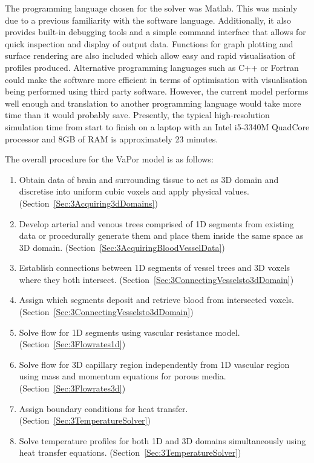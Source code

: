 \documentclass[11pt,english,a4paper,twoside,openright]{report}
\begin{document}
{{{{{{{{The programming language chosen for the solver was Matlab. This was mainly due to a previous familiarity with the software language. Additionally, it also provides built-in debugging tools and a simple command interface that allows for quick inspection and display of output data. Functions for graph plotting and surface rendering are also included which allow easy and rapid visualisation of profiles produced. Alternative programming languages such as C++ or Fortran could make the software more efficient in terms of optimisation with visualisation being performed using third party software. However, the current model performs well enough and translation to another programming language would take more time than it would probably save. Presently, the typical high-resolution simulation time from start to finish on a laptop with an Intel i5-3340M QuadCore processor and 8GB of RAM is approximately 23 minutes.

The overall procedure for the VaPor model is as follows:

\begin{enumerate}
	\setlength\itemsep{0em}
	\item Obtain data of brain and surrounding tissue to act as 3D domain and discretise into uniform cubic voxels and apply physical values. (Section~\ref{Sec:3Acquiring3dDomains})
	\item Develop arterial and venous trees comprised of 1D segments from existing data or procedurally generate them and place them inside the same space as 3D domain. (Section~\ref{Sec:3AcquiringBloodVesselData})
	\item Establish connections between 1D segments of vessel trees and 3D voxels where they both intersect. (Section~\ref{Sec:3ConnectingVesselsto3dDomain})
	\item Assign which segments deposit and retrieve blood from intersected voxels. (Section~\ref{Sec:3ConnectingVesselsto3dDomain})
	\item Solve flow for 1D segments using vascular resistance model. (Section~\ref{Sec:3Flowrates1d})
	\item Solve flow for 3D capillary region independently from 1D vascular region using mass and momentum equations for porous media. (Section~\ref{Sec:3Flowrates3d})
	\item Assign boundary conditions for heat transfer. (Section~\ref{Sec:3TemperatureSolver})
	\item Solve temperature profiles for both 1D and 3D domains simultaneously using heat transfer equations. (Section~\ref{Sec:3TemperatureSolver})
\end{enumerate}

}}}}}}}}
\end{document}
